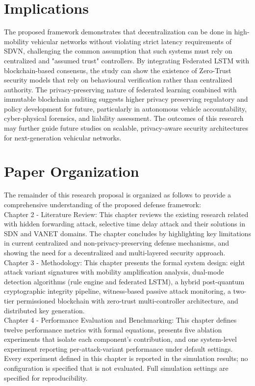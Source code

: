 \documentclass[12pt, a4paper]{report}
\begin{document}
\section{Implications}
The proposed framework demonstrates that decentralization can be done in high-mobility vehicular networks without violating strict latency requirements of SDVN, challenging the common assumption that such systems must rely on centralized and "assumed  trust" controllers. By integrating Federated LSTM with blockchain-based consensus, the study can show the existence of Zero-Trust security models that rely on behavioural verification rather than centralized authority. The privacy-preserving nature of federated learning combined with immutable blockchain auditing suggests higher privacy preserving regulatory and policy development for future, particularly in autonomous vehicle accountability, cyber-physical forensics, and liability assessment. The outcomes of this research may further guide future studies on scalable, privacy-aware security architectures for next-generation vehicular networks.

\section{Paper Organization}

The remainder of this research proposal is organized as follows to provide a comprehensive understanding of the proposed defense framework:
\\

Chapter 2 - Literature Review:
This chapter reviews the existing research related with hidden forwarding  attack, selective time delay attack and their solutions in SDN and VANET domains. The chapter concludes by highlighting key limitations in current centralized and non-privacy-preserving defense mechanisms, and showing  the need for a decentralized and multi-layered security approach.
\\ 

Chapter 3 - Methodology:
This chapter presents the formal system design:
eight attack variant signatures with mobility
amplification analysis, dual-mode detection
algorithms (rule engine and federated LSTM),
a hybrid post-quantum cryptographic integrity
pipeline, witness-based passive attack monitoring,
a two-tier permissioned blockchain with zero-trust
multi-controller architecture, and distributed key
generation.
\\

Chapter 4 - Performance Evaluation and Benchmarking:
This chapter defines twelve performance metrics with
formal equations, presents five ablation
experiments that isolate each component's
contribution, and one system-level experiment
reporting per-attack-variant performance under
default settings. Every experiment defined in this
chapter is reported in the simulation results; no
configuration is specified that is not evaluated.
Full simulation settings are specified for
reproducibility.
\\
\end{document}
